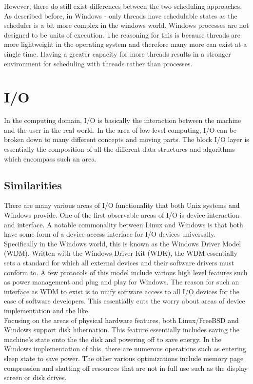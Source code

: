 \documentclass[letterpaper,10pt,titlepage]{article}
\begin{document}
However, there do still exist differences between the two scheduling approaches.  As described before, in Windows - only threads have schedulable states as the scheduler is a bit more complex in the windows world.  Windows processes are not designed to be units of execution.  The reasoning for this is because threads are more lightweight in the operating system and therefore many more can exist at a single time.  Having a greater capacity for more threads results in a stronger environment for scheduling with threads rather than processes.\\

\section{I/O}

In the computing domain, I/O is basically the interaction between the machine and the user in the real world.  In the area of low level computing, I/O can be broken down to many different concepts and moving parts.  The block I/O layer is essentially the composition of all the different data structures and algorithms which encompass such an area.

\subsection{Similarities}

There are many various areas of I/O functionality that both Unix systems and Windows provide.  One of the first observable areas of I/O is device interaction and interface.  A notable commonality between Linux and Windows is that both have some form of a device access interface for I/O devices universally.  Specifically in the Windows world, this is known as the Windows Driver Model (WDM).  Written with the Windows Driver Kit (WDK), the WDM essentially sets a standard for which all external devices and their software drivers must conform to.  A few protocols of this model include various high level features such as power management and plug and play for Windows.\cite{mwi8}  The reason for such an interface as WDM to exist is to unify software access to all I/O devices for the ease of software developers.  This essentially cuts the worry about areas of device implementation and the like.\\

Focusing on the areas of physical hardware features, both Linux/FreeBSD and Windows support disk hibernation.  This feature essentially includes saving the machine's state onto the the disk and powering off to save energy.  In the Windows implementation of this, there are numerous operations such as entering sleep state to save power.  The other various optimizations include memory page compression and shutting off resources that are not in full use such as the display screen or disk drives.\cite{mwi8}\\
\end{document}
